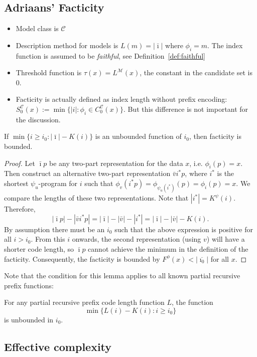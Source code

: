 \documentclass{style/llncs}
\newcommand{\M}{\mathcal M}
\newcommand{\C}{\mathcal C}
\begin{document}
\subsection{Adriaans' Facticity}

\begin{itemize}
\item Model class is $\C$
\item Description method for models is $L(m)=|\bar\imath|$ where
  $\phi_i=m$. The index function is assumed to be \emph{faithful}, see
  Definition~\ref{def:faithful}
\item Threshold function is $\tau(x)=L^\M(x)$, the constant in the candidate set is $0$.
\item Facticity is actually defined as index length without prefix
  encoding:  $S^\C_0(x):=\min\{|i|:\phi_i\in C^\C_0(x)\}$. But this
  difference is not important for the discussion.
\end{itemize}


\begin{lemma}
  If $\min\{i\ge i_0:|\bar\imath|-K(i)\}$ is an unbounded function of $i_0$, then facticity is bounded.
\end{lemma}
\begin{proof}
Let $\bar\imath p$ be any two-part representation for the data $x$, i.e. $\phi_i(p)=x$. Then construct an alternative two-part representation $\bar vi^* p$, where $i^*$ is the shortest $\psi_u$-program for $i$ such that $\phi_v(i^* p)=\phi_{\psi_u(i^*)}(p) = \phi_i(p)=x$. We compare the lengths of these two representations. Note that $|i^*|=K^\psi(i)$. Therefore,
\[
|\bar\imath p|-|\bar v i^* p| = |\bar\imath|-|\bar v| - |i^*| = |\bar\imath|-|\bar v|-K(i).
\]
By assumption there must be an $i_0$ such that the above expression is positive for all $i>i_0$. From this $i$ onwards, the second representation (using $v$) will have a shorter code length, so $\bar\imath p$ cannot achieve the minimum in the definition of the facticity. Consequently, the facticity is bounded by $F^\phi(x)<|\overline{\imath_0}|$ for all $x$. 
\end{proof}
Note that the condition for this lemma applies to all known partial recursive prefix functions:

\begin{conjecture}
For any partial recursive prefix code length function $L$, the function
\[
\min\{L(i)-K(i):i\ge i_0\}
\]
is unbounded in $i_0$.
\end{conjecture}

\subsection{Effective complexity}
\end{document}
